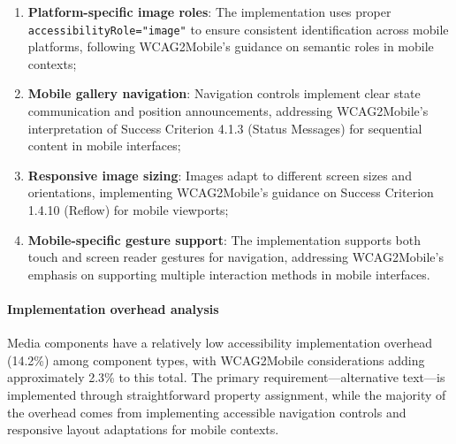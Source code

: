 \begin{enumerate}
    \item \textbf{Platform-specific image roles}: The implementation uses proper \texttt{accessibilityRole="image"} to ensure consistent identification across mobile platforms, following WCAG2Mobile's guidance on semantic roles in mobile contexts;
    
    \item \textbf{Mobile gallery navigation}: Navigation controls implement clear state communication and position announcements, addressing WCAG2Mobile's interpretation of Success Criterion 4.1.3 (Status Messages) for sequential content in mobile interfaces;
    
    \item \textbf{Responsive image sizing}: Images adapt to different screen sizes and orientations, implementing WCAG2Mobile's guidance on Success Criterion 1.4.10 (Reflow) for mobile viewports;
    
    \item \textbf{Mobile-specific gesture support}: The implementation supports both touch and screen reader gestures for navigation, addressing WCAG2Mobile's emphasis on supporting multiple interaction methods in mobile interfaces.
\end{enumerate}

\paragraph{Implementation overhead analysis}

Media components have a relatively low accessibility implementation overhead (14.2\%) among component types, with WCAG2Mobile considerations adding approximately 2.3\% to this total. The primary requirement—alternative text—is implemented through straightforward property assignment, while the majority of the overhead comes from implementing accessible navigation controls and responsive layout adaptations for mobile contexts.


